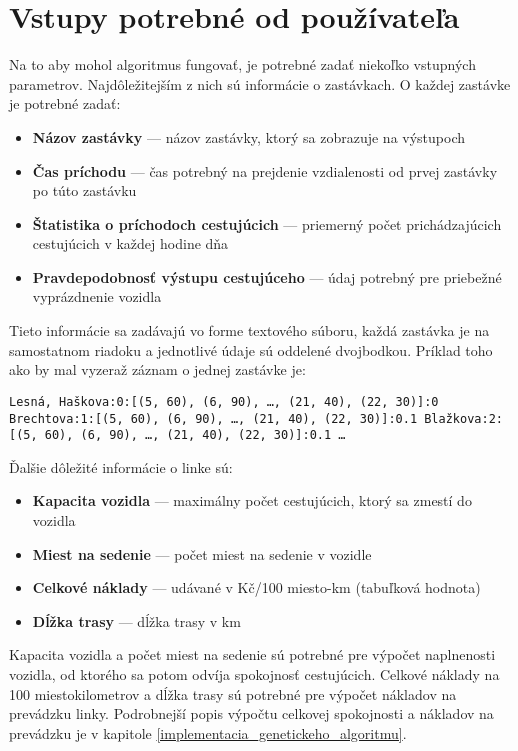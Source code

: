\section{Vstupy potrebné od používateľa}
\label{vstupy_pouzivatela}
Na to aby mohol algoritmus fungovať, je potrebné zadať niekoľko vstupných parametrov.
Najdôležitejším z nich sú informácie o zastávkach. O každej zastávke je potrebné zadať:
\begin{itemize}
  \item \textbf{Názov zastávky} --- názov zastávky, ktorý sa zobrazuje na výstupoch
  \item \textbf{Čas príchodu} --- čas potrebný na prejdenie vzdialenosti od prvej zastávky po túto zastávku
  \item \textbf{Štatistika o príchodoch cestujúcich} --- priemerný počet prichádzajúcich cestujúcich v každej hodine dňa
  \item \textbf{Pravdepodobnosť výstupu cestujúceho} --- údaj potrebný pre priebežné vyprázdnenie vozidla
\end{itemize}
Tieto informácie sa zadávajú vo forme textového súboru, každá zastávka je na samostatnom riadoku a jednotlivé údaje sú oddelené dvojbodkou.
Príklad toho ako by mal vyzeraž záznam o jednej zastávke je:

\noindent \texttt{Lesná, Haškova:0:[(5, 60), (6, 90), \ldots , (21, 40), (22, 30)]:0 \newline
  Brechtova:1:[(5, 60), (6, 90), \ldots , (21, 40), (22, 30)]:0.1 \newline
  Blažkova:2:[(5, 60), (6, 90), \ldots , (21, 40), (22, 30)]:0.1 \newline
  \ldots
}

Ďalšie dôležité informácie o linke sú:
\begin{itemize}
  \item \textbf{Kapacita vozidla} --- maximálny počet cestujúcich, ktorý sa zmestí do vozidla
  \item \textbf{Miest na sedenie} --- počet miest na sedenie v vozidle
  \item \textbf{Celkové náklady} --- udávané v Kč/100 miesto-km (tabuľková hodnota) 
  \item \textbf{Dĺžka trasy} --- dĺžka trasy v km
\end{itemize}
Kapacita vozidla a počet miest na sedenie sú potrebné pre výpočet naplnenosti vozidla, od ktorého sa potom odvíja spokojnosť cestujúcich.
Celkové náklady na 100 miestokilometrov a dĺžka trasy sú potrebné pre výpočet nákladov na prevádzku linky.
Podrobnejší popis výpočtu celkovej spokojnosti a nákladov na prevádzku je v kapitole \ref{implementacia_genetickeho_algoritmu}.

